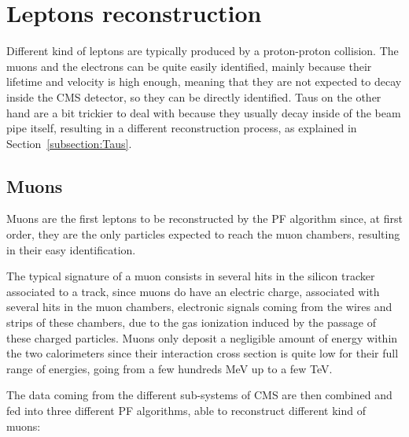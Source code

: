 \documentclass[a4paper, 10pt, openright]{report}
\begin{document}
\section{Leptons reconstruction} \label{section:RecoLep}

Different kind of leptons are typically produced by a proton-proton collision. The muons and the electrons can be quite easily identified, mainly because their lifetime and velocity is high enough, meaning that they are not expected to decay inside the \ac{CMS} detector, so they can be directly identified. Taus on the other hand are a bit trickier to deal with because they usually decay inside of the beam pipe itself, resulting in a different reconstruction process, as explained in Section~\ref{subsection:Taus}.

\subsection{Muons} \label{subsection:Muons}

Muons are the first leptons to be reconstructed by the \ac{PF} algorithm since, at first order, they are the only particles expected to reach the muon chambers, resulting in their easy identification. 

The typical signature of a muon consists in several hits in the silicon tracker associated to a track, since muons do have an electric charge, associated with several hits in the muon chambers, electronic signals coming from the wires and strips of these chambers, due to the gas ionization induced by the passage of these charged particles. Muons only deposit a negligible amount of energy within the two calorimeters since their interaction cross section is quite low for their full range of energies, going from a few hundreds MeV up to a few TeV.

The data coming from the different sub-systems of \ac{CMS} are then combined and fed into three different \ac{PF} algorithms, able to reconstruct different kind of muons:
\end{document}
